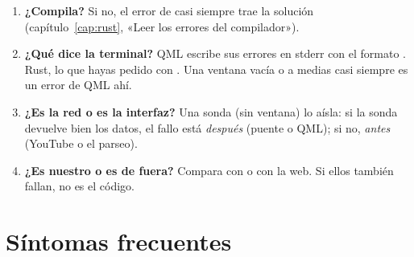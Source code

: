 \begin{enumerate}
  \item \textbf{¿Compila?} Si no, el error de  casi siempre trae la solución
  (capítulo~\ref{cap:rust}, «Leer los errores del compilador»).
  \item \textbf{¿Qué dice la terminal?} QML escribe sus errores en stderr con el formato
  . Rust, lo que hayas pedido con
  . Una ventana vacía o a medias casi siempre es un error de QML ahí.
  \item \textbf{¿Es la red o es la interfaz?} Una sonda  (sin ventana) lo aísla:
  si la sonda devuelve bien los datos, el fallo está \emph{después} (puente o QML); si no,
  \emph{antes} (YouTube o el parseo).
  \item \textbf{¿Es nuestro o es de fuera?} Compara con  o con la web. Si ellos
  también fallan, no es el código.
\end{enumerate}

\section{Síntomas frecuentes}

